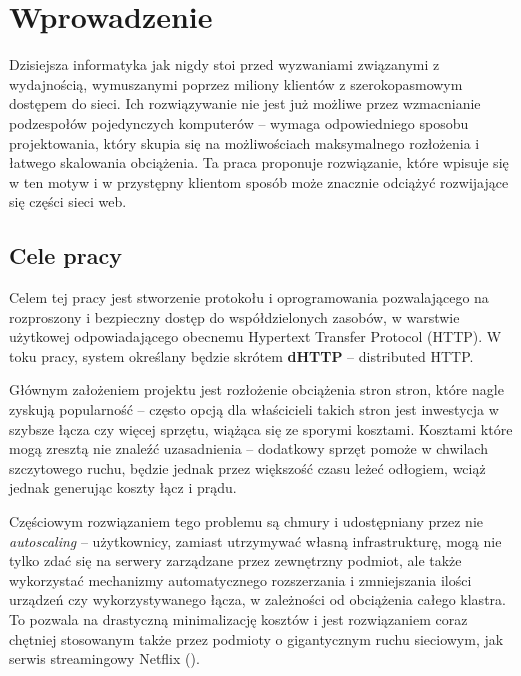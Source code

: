 \chapter{Wprowadzenie}
\label{cha:wprowadzenie}

Dzisiejsza informatyka jak nigdy stoi przed wyzwaniami związanymi z wydajnością, wymuszanymi poprzez miliony klientów z szerokopasmowym dostępem do sieci. Ich rozwiązywanie nie jest już możliwe przez wzmacnianie podzespołów pojedynczych komputerów -- wymaga odpowiedniego sposobu projektowania, który skupia się na możliwościach maksymalnego rozłożenia i łatwego skalowania obciążenia. Ta praca proponuje rozwiązanie, które wpisuje się w ten motyw i w przystępny klientom sposób może znacznie odciążyć rozwijające się części sieci web.

\section{Cele pracy}
\label{sec:celePracy}


Celem tej pracy jest stworzenie protokołu i oprogramowania pozwalającego na rozproszony i bezpieczny dostęp do współdzielonych zasobów, w warstwie użytkowej odpowiadającego obecnemu Hypertext Transfer Protocol (HTTP). W toku pracy, system określany będzie skrótem \textbf{dHTTP} -- distributed HTTP.


Głównym założeniem projektu jest rozłożenie obciążenia stron stron, które nagle zyskują popularność -- często opcją dla właścicieli takich stron jest inwestycja w szybsze łącza czy więcej sprzętu, wiążąca się ze sporymi kosztami. Kosztami które mogą zresztą nie znaleźć uzasadnienia -- dodatkowy sprzęt pomoże w chwilach szczytowego ruchu, będzie jednak przez większość czasu leżeć odłogiem, wciąż jednak generując koszty łącz i prądu.

Częściowym rozwiązaniem tego problemu są chmury i udostępniany przez nie {\em autoscaling} -- użytkownicy, zamiast utrzymywać własną infrastrukturę, mogą nie tylko zdać się na serwery zarządzane przez zewnętrzny podmiot, ale także wykorzystać mechanizmy automatycznego rozszerzania i zmniejszania ilości urządzeń czy wykorzystywanego łącza, w zależności od obciążenia całego klastra. To pozwala na drastyczną minimalizację kosztów i jest rozwiązaniem coraz chętniej stosowanym także przez podmioty o gigantycznym ruchu sieciowym, jak serwis streamingowy Netflix (\cite{AWSAs}).

